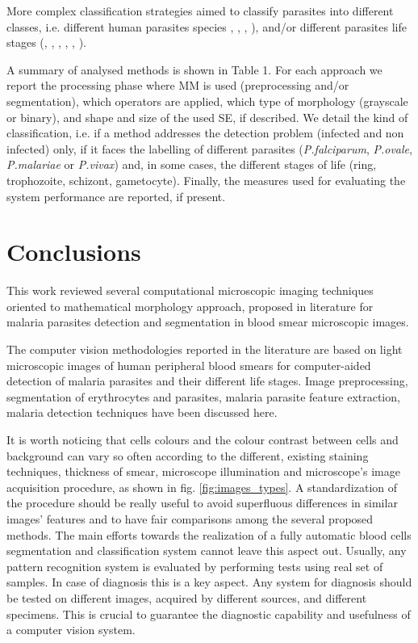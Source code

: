 \documentclass[sensors,review,submit,moreauthors,pdftex,10pt,a4paper]{mdpi}
\begin{document}
More complex classification strategies aimed to classify parasites into different classes, i.e. different human parasites species \cite{Das2013}, \cite{Das2014}, \cite{Khan2011}, \cite{Tek2010}),
and/or different parasites life stages (\cite{Anggraini2011}, \cite{Das2013}, \cite{Das2014}, \cite{DiRuberto2002}, \cite{Diaz2009}, \cite{Tek2010}).

A summary of analysed methods is shown in Table 1. For each approach we report the processing phase where MM is used (preprocessing and/or segmentation), which operators are applied, which type of morphology (grayscale or binary), and shape and size of the used SE, if described. We detail the kind of classification, i.e. if a method addresses the detection problem (infected and non infected) only, if it faces the labelling of different parasites (\emph{P.falciparum}, \emph{P.ovale}, \emph{P.malariae} or \emph{P.vivax}) and, in some cases, the different stages of life (ring, trophozoite, schizont, gametocyte). Finally, the measures used for evaluating the system performance are reported, if present.

\section{Conclusions}
This work reviewed several computational microscopic imaging techniques oriented to mathematical morphology approach, proposed in literature for malaria parasites detection and segmentation in blood smear microscopic images.

The computer vision methodologies reported in the literature are based on light microscopic images of human peripheral blood smears for computer-aided detection of malaria parasites and their different life stages.
Image preprocessing, segmentation of erythrocytes and parasites, malaria parasite feature extraction, malaria detection techniques have been discussed here.

It is worth noticing that cells colours and the colour contrast between cells and background can vary so often according to the different, existing staining techniques, thickness of smear, microscope illumination and microscope's image acquisition procedure, as shown in fig. \ref{fig:images_types}. A standardization of the procedure should be really useful to avoid superfluous differences in similar images' features and to have fair comparisons among the several proposed methods. The main efforts towards the realization of a fully automatic blood cells segmentation and classification system cannot leave this aspect out. Usually, any  pattern recognition system is evaluated by performing tests using real set of samples. In case of diagnosis this is a key aspect. Any system for diagnosis should be tested on different images, acquired by different sources, and different specimens. This is crucial to guarantee the diagnostic capability and usefulness of a computer vision system.
\end{document}

